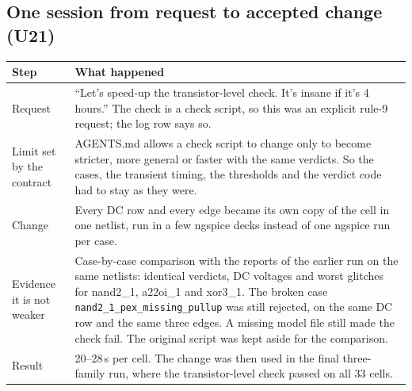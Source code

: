 \documentclass[10pt,a4paper]{article}
\newcommand{\code}[1]{\texttt{#1}}
\begin{document}
\subsection{One session from request to accepted change (U21)}
{\small
\begin{longtable}{@{}L{30mm}L{135mm}@{}}
\toprule
\textbf{Step} & \textbf{What happened}\\
\midrule\endhead
Request & ``Let's speed-up the transistor-level check. It's insane if it's 4 hours.'' The check is a check script, so this was an explicit rule-9 request; the log row says so.\\
Limit set by the contract & AGENTS.md allows a check script to change only to become stricter, more general or faster with the same verdicts. So the cases, the transient timing, the thresholds and the verdict code had to stay as they were.\\
Change & Every DC row and every edge became its own copy of the cell in one netlist, run in a few ngspice decks instead of one ngspice run per case.\\
Evidence it is not weaker & Case-by-case comparison with the reports of the earlier run on the same netlists: identical verdicts, DC voltages and worst glitches for nand2\_1, a22oi\_1 and xor3\_1. The broken case \code{nand2\_1\_pex\_missing\_pullup} was still rejected, on the same DC row and the same three edges. A missing model file still made the check fail. The original script was kept aside for the comparison.\\
Result & 20--28\,s per cell. The change was then used in the final three-family run, where the transistor-level check passed on all 33 cells.\\
\bottomrule
\end{longtable}}
\end{document}
